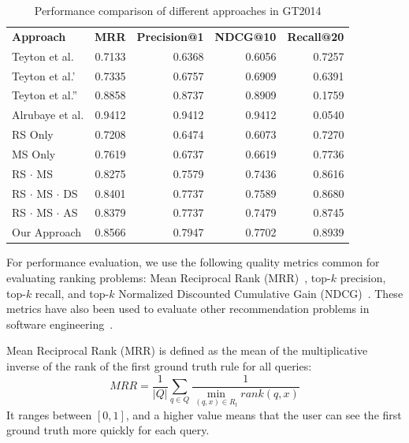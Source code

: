 \documentclass[conference, 10pt]{IEEEtran}
\begin{document}
\begin{table}[]
\caption{Performance comparison of different approaches in GT2014}
\centering
\begin{tabular}{|l|r|r|r|r|}
\hline
\textbf{Approach} & \textbf{MRR} & \textbf{Precision@1} & \textbf{NDCG@10} & \textbf{Recall@20}  \\ 
\hhline{|=|=|=|=|=|}
Teyton et al.            & 0.7133 & 0.6368 & 0.6056 & 0.7257 \\ \hline
Teyton et al.'           & 0.7335 & 0.6757 & 0.6909 & 0.6391 \\ \hline
Teyton et al.''          & 0.8858 & 0.8737 & 0.8909 & 0.1759 \\ \hline
Alrubaye et al.          & 0.9412 & 0.9412 & 0.9412 & 0.0540 \\ \hline
RS Only                  & 0.7208 & 0.6474 & 0.6073 & 0.7270 \\ \hline
MS Only                  & 0.7619 & 0.6737 & 0.6619 & 0.7736 \\ \hline
RS $\cdot$ MS            & 0.8275 & 0.7579 & 0.7436 & 0.8616 \\ \hline
RS $\cdot$ MS $\cdot$ DS & 0.8401 & 0.7737 & 0.7589 & 0.8680 \\ \hline
RS $\cdot$ MS $\cdot$ AS & 0.8379 & 0.7737 & 0.7479 & 0.8745 \\ \hline
Our Approach             & 0.8566 & 0.7947 & 0.7702 & 0.8939 \\ \hline
\end{tabular}
\label{tab:perf-comp}
\end{table}

For performance evaluation, we use the following quality metrics common for evaluating ranking problems: Mean Reciprocal Rank (MRR)~\cite{Craswell2009MRR}, top-$k$ precision, top-$k$ recall, and top-$k$ Normalized Discounted Cumulative Gain (NDCG)~\cite{2002-NDCG}. These metrics have also been used to evaluate other recommendation problems in software engineering~\cite{2013WCRE-Thung-Automated, 2014FSE-Ye-Learning, 2017JSS-Niu-API, 2017InfoSciAndTech-Ouni-Search}. 

Mean Reciprocal Rank (MRR) is defined as the mean of the multiplicative inverse of the rank of the first ground truth rule for all queries:
\begin{equation}
    MRR=\frac{1}{|Q|}\sum_{q \in Q}\frac{1}{\min_{(q,x)\in R_t} rank(q,x)}
\end{equation}
It ranges between $[0,1]$, and a higher value means that the user can see the first ground truth more quickly for each query.
\end{document}
